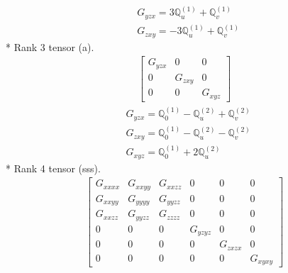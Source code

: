 \documentclass[fleqn,8pt,landscape]{jsarticle}
\begin{document}
\begin{align*}
& G_{yzx} = 3 \mathbb{Q}_{u}^{(1)} + \mathbb{Q}_{v}^{(1)} \\
& G_{zxy} = - 3 \mathbb{Q}_{u}^{(1)} + \mathbb{Q}_{v}^{(1)}
\end{align*}
* Rank 3 tensor (a).
\begin{align*}
\begin{bmatrix} G_{yzx} & 0 & 0 \\ 0 & G_{zxy} & 0 \\ 0 & 0 & G_{xyz} \end{bmatrix}
\end{align*}
\begin{align*}
& G_{yzx} = \mathbb{Q}_{0}^{(1)} - \mathbb{Q}_{u}^{(2)} + \mathbb{Q}_{v}^{(2)} \\
& G_{zxy} = \mathbb{Q}_{0}^{(1)} - \mathbb{Q}_{u}^{(2)} - \mathbb{Q}_{v}^{(2)} \\
& G_{xyz} = \mathbb{Q}_{0}^{(1)} + 2 \mathbb{Q}_{u}^{(2)}
\end{align*}
* Rank 4 tensor (sss).
\begin{align*}
\begin{bmatrix} G_{xxxx} & G_{xxyy} & G_{xxzz} & 0 & 0 & 0 \\ G_{xxyy} & G_{yyyy} & G_{yyzz} & 0 & 0 & 0 \\ G_{xxzz} & G_{yyzz} & G_{zzzz} & 0 & 0 & 0 \\ 0 & 0 & 0 & G_{yzyz} & 0 & 0 \\ 0 & 0 & 0 & 0 & G_{zxzx} & 0 \\ 0 & 0 & 0 & 0 & 0 & G_{xyxy} \end{bmatrix}
\end{align*}
\end{document}
